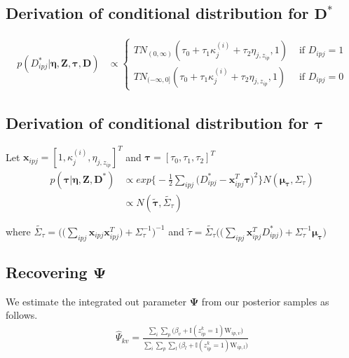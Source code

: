 \subsection{Derivation of conditional distribution for $\textbf{D}^*$}
{\footnotesize
\begin{align}
    p(D^*_{ipj}|\pmb\eta,\mathbf{Z},\pmb\tau, \mathbf{D}) &\propto \begin{cases} TN_{(0,\infty)}(\tau_0+\tau_1\kappa_j^{(i)}+\tau_2\eta_{j,z_{ip}},1) & \text{ if } D_{ipj} = 1 \\
    TN_{(-\infty,0]}(\tau_0+\tau_1\kappa_j^{(i)}+\tau_2\eta_{j,z_{ip}},1) & \text{ if } D_{ipj} = 0
    \end{cases}
\end{align}
}

\subsection{Derivation of conditional distribution for $\pmb\tau$}

Let $\mathbf{x}_{ipj} = [1,\kappa_j^{(i)},\eta_{j,z_{ip}}]^T$ and $\pmb\tau = [\tau_0,\tau_1,\tau_2]^T$
\begin{align}
    p(\pmb\tau|\pmb\eta,\mathbf{Z},\mathbf{D}^*) &\propto exp\Bigg\{-\frac{1}{2} \sum_{ipj}\Big(D_{ipj}^* - \mathbf{x}_{ipj}^T\pmb\tau \Big)^2 \Bigg\} N(\pmb\mu_{\pmb\tau},\Sigma_{\tau})\nonumber \\
    &\propto N(\tilde{\pmb\tau},\tilde{\Sigma_{\tau}})
\end{align}

where $\tilde{\Sigma_{\tau}} = \Bigg(\Big(\sum_{ipj}\mathbf{x}_{ipj}\mathbf{x}_{ipj}^T \Big) + \Sigma_{\tau}^{-1} \Bigg)^{-1}$ 
and $\tilde{\tau} = \tilde{\Sigma_{\tau}}\Bigg(\Big(\sum_{ipj}\mathbf{x}_{ipj}^TD_{ipj}^*\Big) + \Sigma_{\tau}^{-1}\pmb\mu_{\pmb\tau}\Bigg)$

\subsection{Recovering $\pmb\Psi$}
\label{subsec:Psi}
We estimate the integrated out parameter $\pmb\Psi$ from our posterior samples as follows.
\begin{align}
	\hat{\Psi}_{kv} =  \frac{\sum_{i}\sum_{p} \big(\beta_v + \mathbb{I}(z_{ip}^k=1)\text{W}_{ip,v} \big)}{\sum_{i}\sum_{p}\sum_l \big(\beta_l + \mathbb{I}(z_{ip}^k=1)\text{W}_{ip,l}\big)}
\end{align}
